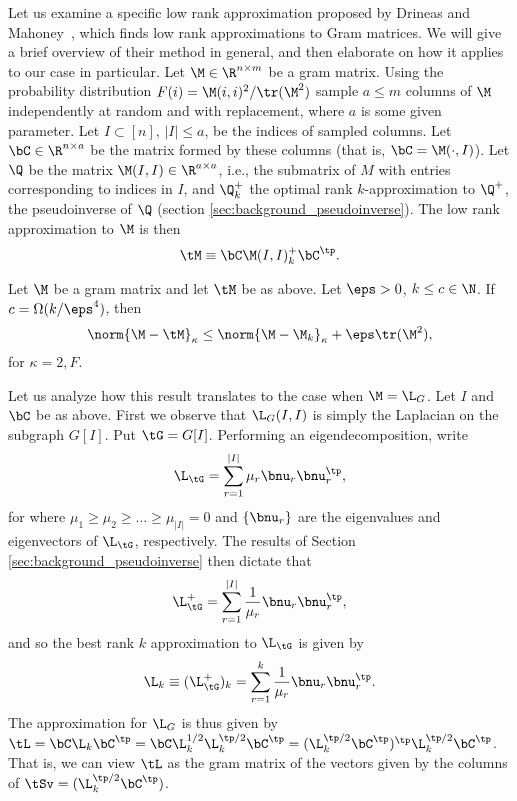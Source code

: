 Let us examine a specific low rank approximation proposed by Drineas and Mahoney~\cite{drineas2005approximating}, which finds low rank approximations to Gram matrices. We will give a brief overview of their method in general, and then elaborate on how it applies to our case in particular. Let $\M\in\R^{n\times m}$ be a gram matrix. Using the probability distribution $F(i) = \M(i,i)^2 / \tr(\M^2)$ sample $a\leq m$ columns of $\M$ independently at random and with replacement, where $a$ is some given parameter. Let $I\subset[n]$, $|I|\leq a$, be the indices of sampled columns. Let $\bC\in\R^{n\times a}$ be the matrix formed by these columns (that is, $\bC=\M(\cdot,I)$).  Let $\Q$ be the matrix $\M(I,I)\in\R^{a\times a}$, i.e., the submatrix of $M$ with entries corresponding to indices in $I$, and $\Q^+_k$  the optimal rank $k$-approximation to $\Q^+$, the pseudoinverse of $\Q$ (section \ref{sec:background_pseudoinverse}). The low rank approximation to $\M$ is then 
\begin{equation*}
\tM \equiv \bC\M(I,I)_k^+\bC^\tp.
\end{equation*}

\begin{theorem}
	Let $\M$ be a gram matrix and let $\tM$ be as above. Let $\eps>0$,  $k\leq c\in\N$. If $c=\Omega(k/\eps^4)$, then 
	\begin{equation*}
	\norm{\M-\tM}_\kappa \leq \norm{\M-\M_k}_\kappa + \eps \tr(\M^2),
	\end{equation*}
	for $\kappa=2,F$. 
\end{theorem}

Let us analyze how this result translates to the case when $\M=\L_G$. Let $I$ and $\bC$ be as above. First we observe that $\L_G(I,I)$ is simply the Laplacian on the subgraph $G[I]$. Put $\tG = G[I]$. Performing an eigendecomposition, write 
\begin{equation*}
\L_\tG = \sum_{r=1}^{|I|} \mu_r \bnu_r\bnu_r^\tp,
\end{equation*}
for where $\mu_1\geq \mu_2\geq \dots \geq \mu_{|I|}=0$ and $\{\bnu_r\}$ are the eigenvalues and eigenvectors of $\L_\tG$, respectively. The results of Section \ref{sec:background_pseudoinverse} then dictate that 
\begin{equation*}
\L_\tG^+ = \sum_{r=1}^{|I|} \frac{1}{\mu_r} \bnu_r\bnu_r^\tp,
\end{equation*}
and so the best rank $k$ approximation to $\L_\tG$ is given by 
\begin{equation*}
\L_k \equiv (\L_\tG^+)_k = \sum_{r=1}^{k} \frac{1}{\mu_r} \bnu_r\bnu_r^\tp.
\end{equation*}
The approximation for $\L_G$ is thus given by $\tL=\bC\L_k\bC^\tp=\bC\L_k^{1/2}\L_k^{\tp/2}\bC^\tp = (\L_k^{\tp/2}\bC^\tp)^\tp \L_k^{\tp/2}\bC^\tp$. That is, we can view $\tL$ as the gram matrix of the vectors given by the columns of $\tSv =  (\L_k^{\tp/2}\bC^\tp)$. 

